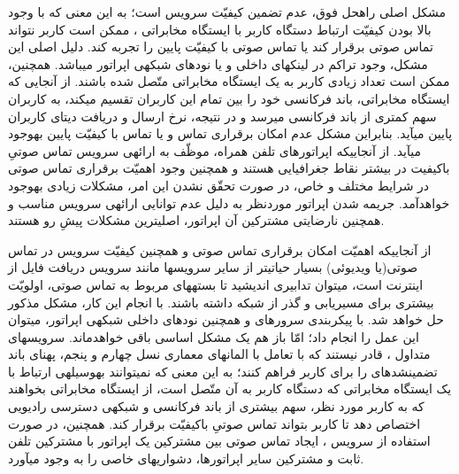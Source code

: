 مشکل اصلی راه\nf حل فوق، عدم تضمین کیفیّت سرویس است؛ به این معنی که با وجود بالا بودن کیفیّت ارتباط دستگاه کاربر با ایستگاه مخابراتی ، ممکن است کاربر نتواند تماس صوتی برقرار کند یا تماس صوتی با کیفیّت پایین را تجربه کند. دلیل اصلی این مشکل، وجود تراکم در لینک\nf های داخلی و یا نودهای شبکه\nf ی اپراتور می\nf باشد. همچنین، ممکن است تعداد زیادی کاربر به یک ایستگاه مخابراتی متّصل شده باشند. از آنجایی که ایستگاه مخابراتی، باند فرکانسی خود را بین تمام این کاربران تقسیم می\nf کند، به کاربران سهم کم\nf تری از باند فرکانسی می\nf رسد و در نتیجه، نرخ ارسال و دریافت دیتای کاربران پایین می\nf آید. بنابراین مشکل عدم امکان برقراری تماس و یا تماس با کیفیّت پایین به\nf وجود می\nf آید. از آنجایی\nf که اپراتورهای تلفن همراه، موظّف به ارائه\nf ی سرویس تماس صوتیِ باکیفیت در بیشتر نقاط جغرافیایی هستند و همچنین وجود اهمیّت برقراری تماس صوتی در شرایط مختلف و خاص، در صورت تحقّق نشدن این امر، مشکلات زیادی به\nf وجود خواهدآمد. جریمه شدن اپراتور موردنظر به دلیل عدم توانایی ارائه\nf ی سرویس مناسب و همچنین نارضایتی مشترکین آن اپراتور، اصلی\nf ترین مشکلات پیشِ رو هستند.

از آنجایی\nf که اهمیّت امکان برقراری تماس صوتی و همچنین کیفیّت سرویس در تماس صوتی(یا ویدیوئی) بسیار حیاتی\nf تر از سایر سرویس\nf ها مانند سرویس دریافت فایل از اینترنت است، می\nf توان تدابیری اندیشید تا بسته\nf های مربوط به تماس صوتی، اولويّت بیشتری برای مسیریابی و گذر از شبکه داشته باشند. با انجام این کار، مشکل مذکور حل خواهد شد. با پیکربندی سرورهای  و همچنین نودهای داخلی شبکه\nf ی اپراتور، می\nf توان این عمل را انجام داد؛ امّا باز هم یک مشکل اساسی باقی خواهدماند. سرویس\nf های متداول ، قادر نیستند که با تعامل با المان\nf های معماری نسل چهارم و پنجم، پهنای باند تضمین\nf شده\nf ای را برای کاربر فراهم کنند؛ به این معنی که نمی\nf توانند به\nf وسیله\nf ی ارتباط با یک ایستگاه مخابراتی که دستگاه کاربر به آن متّصل است، از ایستگاه مخابراتی بخواهند که به کاربر مورد نظر، سهم بیشتری از باند فرکانسی و شبکه\nf ی دسترسی رادیویی اختصاص دهد تا کاربر بتواند تماس صوتیِ باکیفیّت برقرار کند. همچنین، در صورت استفاده از سرویس ، ایجاد تماس صوتی بین مشترکین یک اپراتور با مشترکین تلفن ثابت و مشترکین سایر اپراتورها، دشواری\nf های خاصی را به وجود می\nf آورد.

